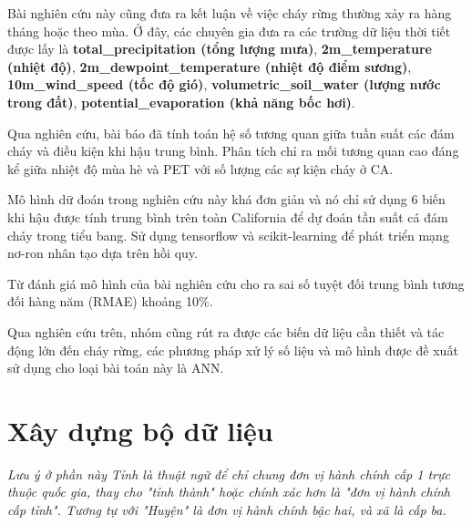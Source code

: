 \documentclass{article}
\begin{document}
Bài nghiên cứu này cũng đưa ra kết luận về việc cháy rừng thường xảy ra hàng tháng hoặc theo mùa. Ở đây, các chuyên gia đưa ra các trường dữ liệu thời tiết được lấy là \textbf{total\_precipitation (tổng lượng mưa)}, \textbf{2m\_temperature (nhiệt độ)}, \textbf{2m\_dewpoint\_temperature (nhiệt độ điểm sương)}, \textbf{10m\_wind\_speed (tốc độ gió)}, \textbf{volumetric\_soil\_water (lượng nước trong đất)}, \textbf{potential\_evaporation (khả năng bốc hơi)}.

Qua nghiên cứu, bài báo đã tính toán hệ số tương quan giữa tuần suất các đám cháy và điều kiện khi hậu trung bình. Phân tích chỉ ra mối tương quan cao đáng kể giữa nhiệt độ mùa hè và PET với số lượng các sự kiện cháy ở CA.

Mô hình dữ đoán trong nghiên cứu này khá đơn giản và nó chỉ sử dụng 6 biến khi hậu được tính trung bình trên toàn California để dự đoán tần suất cá đám cháy trong tiểu bang. Sử dụng tensorflow và scikit-learning để phát triển mạng nơ-ron nhân tạo dựa trên hồi quy.

Từ đánh giá mô hình của bài nghiên cứu cho ra sai số tuyệt đối trung bình tương đối hàng năm (RMAE) khoảng 10\%.

Qua nghiên cứu trên, nhóm cũng rút ra được các biến dữ liệu cần thiết và tác động lớn đến cháy rừng, các phương pháp xử lý số liệu và mô hình được đề xuất sử dụng cho loại bài toán này là ANN.
\section{Xây dựng bộ dữ liệu}


\emph{Lưu ý ở phần này Tỉnh là thuật ngữ để chỉ chung đơn vị hành chính cấp 1 trực thuộc quốc gia, thay cho "tỉnh thành" hoặc chính xác hơn là "đơn vị hành chính cấp tỉnh". Tương tự với "Huyện" là đơn vị hành chính bậc hai, và xã là cấp ba.}
\end{document}
